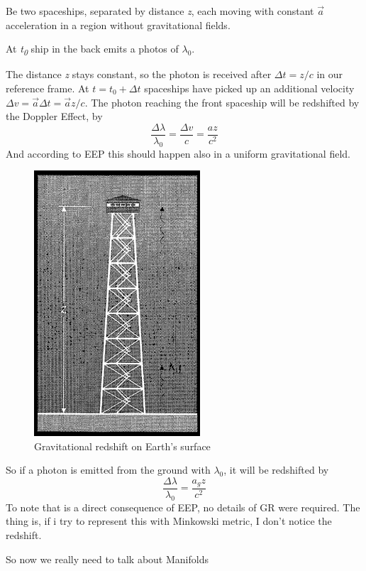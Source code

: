 Be two spaceships, separated by distance \emph{z}, each moving with constant $\vec{a}$ acceleration in a region without gravitational fields. \par
At \emph{t\textsubscript{0}} ship in the back emits a photos of $\lambda_{0}$.\par
The distance \emph{z} stays constant, so the photon is received after $\Delta t = z/c$ in our reference frame. At $t = t_{0}+ \Delta t$ spaceships have picked up an additional velocity $\Delta v = \vec{a}\Delta t = \vec{a}z/c$. The photon reaching the front spaceship will be redshifted by the Doppler Effect, by \[
\frac{\Delta \lambda }{\lambda_{0}} = \frac{\Delta v}{c} = \frac{a z}{c^{2}}
\]
And according to EEP this should happen also in a uniform gravitational field.\par
\begin{figure}[h]
\centering
\includegraphics[width=0.3\linewidth]{imm/gravshift2.png}
\caption{Gravitational redshift on Earth's surface}
\label{imm:gravshift2}
\end{figure}
So if a photon is emitted from the ground with $\lambda_{0}$, it will be redshifted by
\[
\frac{\Delta  \lambda }{\lambda_{0}} = \frac{a_{g}z}{c^{2}}
\]
To note that is a direct consequence of EEP, no details of GR were required.
The thing is, if i try to represent this with Minkowski metric, I don't notice the redshift.

So now we really need to talk about Manifolds
